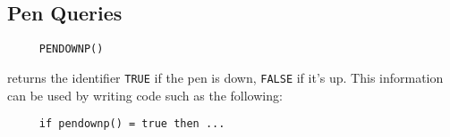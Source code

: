 




\subsection{Pen Queries}

\begin{verbatim}
     PENDOWNP()
\end{verbatim}
returns the identifier \texttt{TRUE} if the pen is down,
\texttt{FALSE} if it's up.  This information can be used by writing
code such as the following:
\begin{verbatim}
     if pendownp() = true then ...
\end{verbatim}




